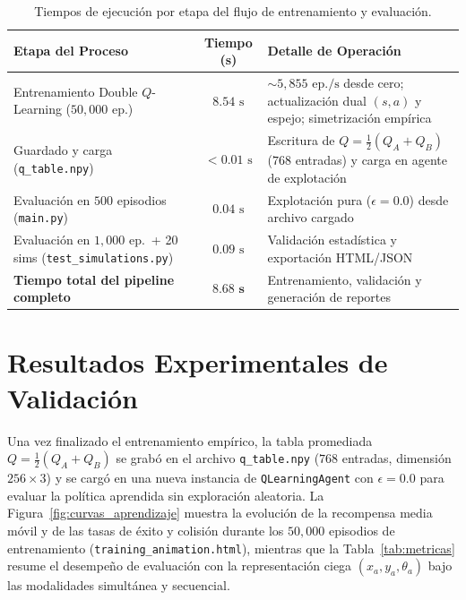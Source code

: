 \documentclass[11pt,a4paper]{article}
\begin{document}
\begin{table}[h!]
\centering
\small
\renewcommand{\arraystretch}{1.18}
\caption{Tiempos de ejecución por etapa del flujo de entrenamiento y evaluación.}
\label{tab:tiempos}
\vspace{0.15cm}
\begin{tabularx}{\textwidth}{@{}>{\raggedright\arraybackslash}p{6.5cm} c >{\raggedright\arraybackslash}X@{}}
\toprule
\textbf{Etapa del Proceso} & \textbf{Tiempo (s)} & \textbf{Detalle de Operación} \\ \midrule
Entrenamiento Double \(Q\)-Learning (\(50{,}000\) ep.) & \(8.54\text{ s}\) & \(\sim 5{,}855\text{ ep./s}\) desde cero; actualización dual \((s,a)\) y espejo; simetrización empírica \\
Guardado y carga (\texttt{q\_table.npy}) & \(<0.01\text{ s}\) & Escritura de \(Q = \frac{1}{2}(Q_A + Q_B)\) (\(768\) entradas) y carga en agente de explotación \\
Evaluación en \(500\) episodios (\texttt{main.py}) & \(0.04\text{ s}\) & Explotación pura (\(\epsilon = 0.0\)) desde archivo cargado \\
Evaluación en \(1{,}000\) ep.\ + 20 sims (\texttt{test\_simulations.py}) & \(0.09\text{ s}\) & Validación estadística y exportación HTML/JSON \\ \midrule
\textbf{Tiempo total del pipeline completo} & \(\mathbf{8.68\text{ s}}\) & Entrenamiento, validación y generación de reportes \\ \bottomrule
\end{tabularx}
\end{table}

\section{Resultados Experimentales de Validación}
Una vez finalizado el entrenamiento empírico, la tabla promediada \(Q = \frac{1}{2}(Q_A + Q_B)\) se grabó en el archivo \texttt{q\_table.npy} (\(768\) entradas, dimensión \(256 \times 3\)) y se cargó en una nueva instancia de \texttt{QLearningAgent} con \(\epsilon = 0.0\) para evaluar la política aprendida sin exploración aleatoria. La Figura~\ref{fig:curvas_aprendizaje} muestra la evolución de la recompensa media móvil y de las tasas de éxito y colisión durante los \(50{,}000\) episodios de entrenamiento (\texttt{training\_animation.html}), mientras que la Tabla~\ref{tab:metricas} resume el desempeño de evaluación con la representación ciega \((x_a, y_a, \theta_a)\) bajo las modalidades simultánea y secuencial.
\end{document}
